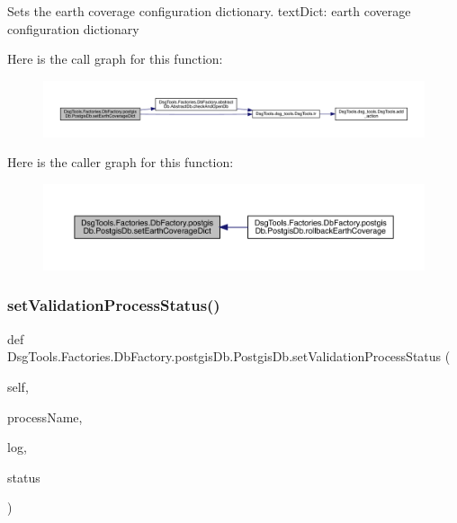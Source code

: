 \begin{DoxyVerb}Sets the earth coverage configuration dictionary.
textDict: earth coverage configuration dictionary
\end{DoxyVerb}
 Here is the call graph for this function\+:
\nopagebreak
\begin{figure}[H]
\begin{center}
\leavevmode
\includegraphics[width=350pt]{class_dsg_tools_1_1_factories_1_1_db_factory_1_1postgis_db_1_1_postgis_db_a29caf37621c8c30add3322f044fe702f_cgraph}
\end{center}
\end{figure}
Here is the caller graph for this function\+:
\nopagebreak
\begin{figure}[H]
\begin{center}
\leavevmode
\includegraphics[width=350pt]{class_dsg_tools_1_1_factories_1_1_db_factory_1_1postgis_db_1_1_postgis_db_a29caf37621c8c30add3322f044fe702f_icgraph}
\end{center}
\end{figure}
\mbox{\label{class_dsg_tools_1_1_factories_1_1_db_factory_1_1postgis_db_1_1_postgis_db_afdd4d6d2db4d633abeea3d6c977c56b7}} 
\subsubsection{\texorpdfstring{set\+Validation\+Process\+Status()}{setValidationProcessStatus()}}
{\footnotesize\ttfamily def Dsg\+Tools.\+Factories.\+Db\+Factory.\+postgis\+Db.\+Postgis\+Db.\+set\+Validation\+Process\+Status (\begin{DoxyParamCaption}\item[{}]{self,  }\item[{}]{process\+Name,  }\item[{}]{log,  }\item[{}]{status }\end{DoxyParamCaption})}

